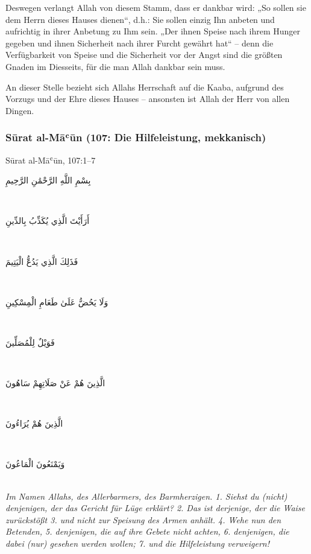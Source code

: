 Deswegen verlangt Allah von diesem Stamm, dass er dankbar wird: „So sollen sie dem Herrn
dieses Hauses dienen“, d.h.: Sie sollen einzig Ihn anbeten und aufrichtig in ihrer Anbetung zu Ihm
sein. „Der ihnen Speise nach ihrem Hunger gegeben und ihnen Sicherheit nach ihrer Furcht
gewährt hat“ – denn die Verfügbarkeit von Speise und die Sicherheit vor der Angst sind die
größten Gnaden im Diesseits, für die man Allah dankbar sein muss.

\begin{merke}
An dieser Stelle bezieht sich Allahs Herrschaft auf die Kaaba, aufgrund des Vorzugs und der Ehre
dieses Hauses – ansonsten ist Allah der Herr von allen Dingen.
\end{merke}

\subsubsection*{Sūrat al-Māʿūn (107: Die Hilfeleistung, mekkanisch)}

\begin{quranvers}{Sūrat al-Māʿūn, 107:1--7}
{\quranfont\begin{Arabic}
بِسْمِ اللَّهِ الرَّحْمَٰنِ الرَّحِيمِ
\end{Arabic}}\\[2mm]
{\quranfont\begin{Arabic}
أَرَأَيْتَ الَّذِي يُكَذِّبُ بِالدِّينِ
\end{Arabic}}\\[2mm]
{\quranfont\begin{Arabic}
فَذَلِكَ الَّذِي يَدُعُّ الْيَتِيمَ
\end{Arabic}}\\[2mm]
{\quranfont\begin{Arabic}
وَلَا يَحُضُّ عَلَىٰ طَعَامِ الْمِسْكِينِ
\end{Arabic}}\\[2mm]
{\quranfont\begin{Arabic}
فَوَيْلٌ لِلْمُصَلِّينَ
\end{Arabic}}\\[2mm]
{\quranfont\begin{Arabic}
الَّذِينَ هُمْ عَنْ صَلَاتِهِمْ سَاهُونَ
\end{Arabic}}\\[2mm]
{\quranfont\begin{Arabic}
الَّذِينَ هُمْ يُرَاءُونَ
\end{Arabic}}\\[2mm]
{\quranfont\begin{Arabic}
وَيَمْنَعُونَ الْمَاعُونَ
\end{Arabic}}\\[3mm]
\emph{Im Namen Allahs, des Allerbarmers, des Barmherzigen. 1. Siehst du (nicht) denjenigen, der
das Gericht für Lüge erklärt? 2. Das ist derjenige, der die Waise zurückstößt 3. und nicht zur
Speisung des Armen anhält. 4. Wehe nun den Betenden, 5. denjenigen, die auf ihre Gebete nicht
achten, 6. denjenigen, die dabei (nur) gesehen werden wollen; 7. und die Hilfeleistung
verweigern!}
\end{quranvers}

